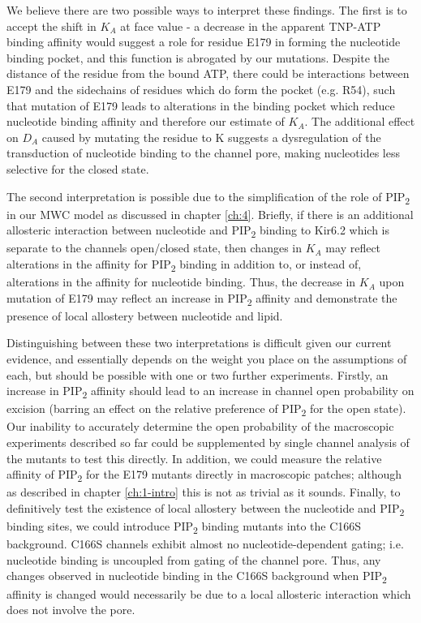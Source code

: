 We believe there are two possible ways to interpret these findings.
The first is to accept the shift in $K_A$ at face value - a decrease in the apparent TNP-ATP binding affinity would suggest a role for residue E179 in forming the nucleotide binding pocket, and this function is abrogated by our mutations.
Despite the distance of the residue from the bound ATP, there could be interactions between E179 and the sidechains of residues which do form the pocket (e.g. R54), such that mutation of E179 leads to alterations in the binding pocket which reduce nucleotide binding affinity and therefore our estimate of $K_A$.
The additional effect on $D_A$ caused by mutating the residue to K suggests a dysregulation of the transduction of nucleotide binding to the channel pore, making nucleotides less selective for the closed state.

The second interpretation is possible due to the simplification of the role of PIP\textsubscript{2} in our MWC model as discussed in chapter \ref{ch:4}.
Briefly, if there is an additional allosteric interaction between nucleotide and PIP\textsubscript{2} binding to Kir6.2 which is separate to the channels open/closed state, then changes in $K_A$ may reflect alterations in the affinity for PIP\textsubscript{2} binding in addition to, or instead of, alterations in the affinity for nucleotide binding.
Thus, the decrease in $K_A$ upon mutation of E179 may reflect an increase in PIP\textsubscript{2} affinity and demonstrate the presence of local allostery between nucleotide and lipid.

Distinguishing between these two interpretations is difficult given our current evidence, and essentially depends on the weight you place on the assumptions of each, but should be possible with one or two further experiments.
Firstly, an increase in PIP\textsubscript{2} affinity should lead to an increase in channel open probability on excision (barring an effect on the relative preference of PIP\textsubscript{2} for the open state).
Our inability to accurately determine the open probability of the macroscopic experiments described so far could be supplemented by single channel analysis of the mutants to test this directly.
In addition, we could measure the relative affinity of PIP\textsubscript{2} for the E179 mutants directly in macroscopic patches; although as described in chapter \ref{ch:1-intro} this is not as trivial as it sounds.
Finally, to definitively test the existence of local allostery between the nucleotide and PIP\textsubscript{2} binding sites, we could introduce PIP\textsubscript{2} binding mutants into the C166S background.
C166S channels exhibit almost no nucleotide-dependent gating; i.e. nucleotide binding is uncoupled from gating of the channel pore.
Thus, any changes observed in nucleotide binding in the C166S background when PIP\textsubscript{2} affinity is changed would necessarily be due to a local allosteric interaction which does not involve the pore.

